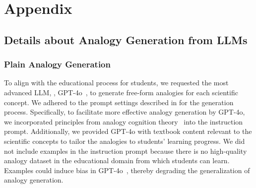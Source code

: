 \newpage
\section*{Appendix}
\subsection{Details about Analogy Generation from LLMs}

% 
\subsubsection{Plain Analogy Generation}
To align with the educational process for students, we requested the most advanced LLM, \ie, GPT-4o~\cite{openai_gpt-4_2023}, to generate free-form analogies for each scientific concept. We adhered to the prompt settings described in \cite{bhavya-etal-2022-analogy} for the generation process. 
Specifically, to facilitate more effective analogy generation by GPT-4o, we incorporated principles from analogy cognition theory~\cite{hesse1959defining,gentner1983structure,gentner2017analogy} into the instruction prompt. Additionally, we provided GPT-4o with textbook content relevant to the scientific concepts to tailor the analogies to students' learning progress.
We did not include examples in the instruction prompt because there is no high-quality analogy dataset in the educational domain from which students can learn. 
Examples could induce bias in GPT-4o~\cite{pmlr-v139-zhao21c}, thereby degrading the generalization of analogy generation.

